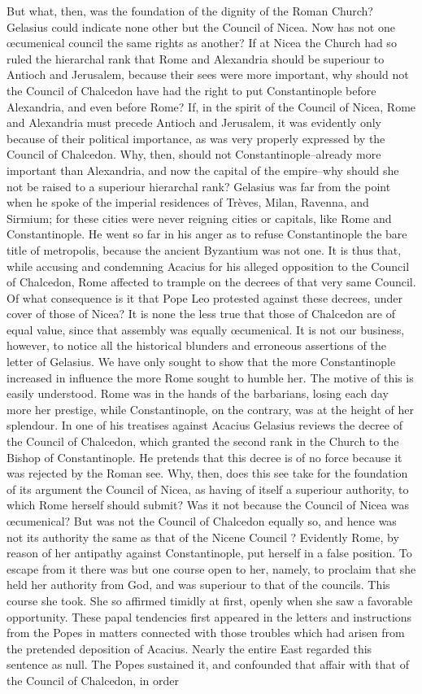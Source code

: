 But what, then, was the foundation of the dignity of the Roman Church? Gelasius could indicate none other but the Council of Nicea. Now has not one œcumenical council the same rights as another? If at Nicea the Church had so ruled the hierarchal rank that Rome and Alexandria should be superiour to Antioch and Jerusalem, because their sees were more important, why should not the Council of Chalcedon have had the right to put Constantinople before Alexandria, and even before Rome? If, in the spirit of the Council of Nicea, Rome and Alexandria must precede Antioch and Jerusalem, it was evidently only because of their political importance, as was very properly expressed by the Council of Chalcedon. Why, then, should not Constantinople--already more important than Alexandria, and now the capital of the empire--why should she not be raised to a superiour hierarchal rank? Gelasius was far from the point when he spoke of the imperial residences of Trèves, Milan, Ravenna, and Sirmium; for these cities were never reigning cities or capitals, like Rome and Constantinople. He went so far in his anger as to refuse Constantinople the bare title of metropolis, because the ancient Byzantium was not one. It is thus that, while accusing and condemning Acacius for his alleged opposition to the Council of Chalcedon, Rome affected to trample on the decrees of that very same Council. Of what consequence is it that Pope Leo protested against these decrees, under cover of those of Nicea? It is none the less true that those of Chalcedon are of equal value, since that assembly was equally œcumenical. It is not our business, however, to notice all the historical blunders and erroneous assertions of the letter of Gelasius. We have only sought to show that the more Constantinople increased in influence the more Rome sought to humble her. The motive of this is easily understood. Rome was in the hands of the barbarians, losing each day more her prestige, while Constantinople, on the contrary, was at the height of her splendour. In one of his treatises against Acacius Gelasius reviews the decree of the Council of Chalcedon, which granted the second rank in the Church to the Bishop of Constantinople. He pretends that this decree is of no force because it was rejected by the Roman see. Why, then, does this see take for the foundation of its argument the Council of Nicea, as having of itself a superiour authority, to which Rome herself should submit? Was it not because the Council of Nicea was œcumenical? But was not the Council of Chalcedon equally so, and hence was not its authority the same as that of the Nicene Council ? Evidently Rome, by reason of her antipathy against Constantinople, put herself in a false position. To escape from it there was but one course open to her, namely, to proclaim that she held her authority from God, and was superiour to that of the councils. This course she took. She so affirmed timidly at first, openly when she saw a favorable opportunity. These papal tendencies first appeared in the letters and instructions from the Popes in matters connected with those troubles which had arisen from the pretended deposition of Acacius. Nearly the entire East regarded this sentence as null. The Popes sustained it, and confounded that affair with that of the Council of Chalcedon, in order 